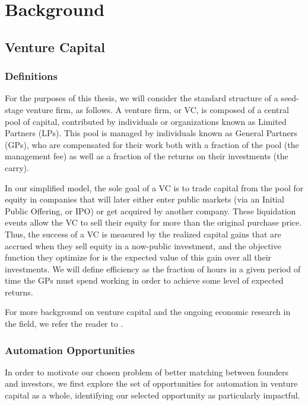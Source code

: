 \chapter{Background}

\section{Venture Capital}

\subsection{Definitions}

For the purposes of this thesis, we will consider the standard structure of a seed-stage venture firm, as follows. A venture firm, or VC, is composed of a central pool of capital, contributed by individuals or organizations known as Limited Partners (LPs). This pool is managed by individuals known as General Partners (GPs), who are compensated for their work both with a fraction of the pool (the management fee) as well as a fraction of the returns on their investments (the carry).

In our simplified model, the sole goal of a VC is to trade capital from the pool for equity in companies that will later either enter public markets (via an Initial Public Offering, or IPO) or get acquired by another company. These liquidation events allow the VC to sell their equity for more than the original purchase price. Thus, the success of a VC is measured by the realized capital gains that are accrued when they sell equity in a now-public investment, and the objective function they optimize for is the expected value of this gain over all their investments. We will define efficiency as the fraction of hours in a given period of time the GPs must spend working in order to achieve some level of expected returns.

For more background on venture capital and the ongoing economic research in the field, we refer the reader to \cite{venture-survey}.

\subsection{Automation Opportunities}

In order to motivate our chosen problem of better matching between founders and investors, we first explore the set of opportunities for automation in venture capital as a whole, identifying our selected opportunity as particularly impactful.


